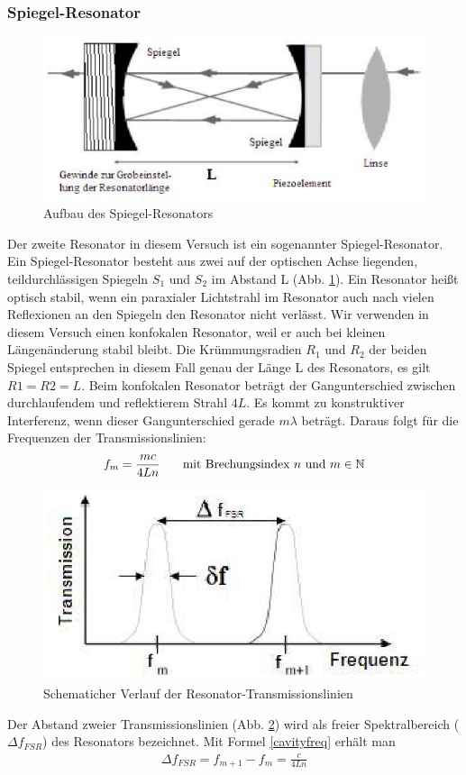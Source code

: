 \documentclass[12pt]{article}
\begin{document}
\subsubsection{Spiegel-Resonator}
\begin{figure}[H]
 \includegraphics[width=0.9\linewidth]{pictures/cavity.eps}
 \caption{Aufbau des Spiegel-Resonators}
 \label{cavity}
\end{figure}
Der zweite Resonator in diesem Versuch ist ein sogenannter Spiegel-Resonator. Ein Spiegel-Resonator  besteht aus zwei auf der optischen Achse liegenden,
teildurchlässigen Spiegeln $S_1$ und $S_2$ im Abstand L (Abb. \ref{cavity}). Ein Resonator heißt optisch stabil, wenn ein paraxialer Lichtstrahl im Resonator
auch nach vielen Reflexionen an den Spiegeln den Resonator nicht verlässt. Wir verwenden in diesem Versuch einen konfokalen Resonator, weil er auch bei kleinen Längenänderung stabil bleibt. Die Krümmungsradien $R_1$ und $R_2$ der beiden Spiegel entsprechen in diesem Fall genau der Länge L des Resonators, es gilt $R1 =R2 = L$. Beim konfokalen Resonator beträgt der Gangunterschied zwischen durchlaufendem und reflektierem Strahl $4L$. Es kommt zu konstruktiver Interferenz, wenn dieser Gangunterschied gerade $m\lambda$  beträgt. Daraus folgt für die Frequenzen der Transmissionslinien:
\begin{align}
\label{cavityfreq}
 f_m = \frac{mc}{4Ln}\hspace{15pt}\textnormal{ mit Brechungsindex }n\textnormal{ und } m \in \mathbb N
\end{align}
\begin{figure}[H]
 \includegraphics[width=0.9\linewidth]{pictures/cavitypeaks.eps}
 \caption{Schematicher Verlauf der Resonator-Transmissionslinien}
 \label{cavitypeaks}
\end{figure}
Der Abstand zweier Transmissionslinien (Abb. \ref{cavitypeaks}) wird als freier Spektralbereich ($\Delta f_{FSR}$) des Resonators bezeichnet. Mit Formel \ref{cavityfreq} erhält man
\begin{align}
\label{freespecrange}
 \Delta f_{FSR} = f_{m+1}-f_{m} = \frac{c}{4Ln}
\end{align}
 
\end{document}
